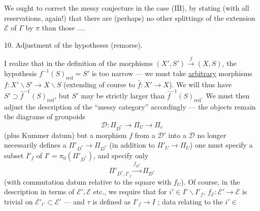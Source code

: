 We ought to correct the messy conjecture in the case (\uline{$\overline{\mathrm{III}}$}), by stating (with all reservations, again!) that there are (perhaps) no other splittings of the extension $\mathcal{E}$ of $\Gamma$ by $\pi$ than those ....



10. Adjustment of the hypotheses (remorse).

I realize that in the definition of the morphisms $(X',S')\xrightarrow{f}(X,S)$, the hypothesis $f^{-1}(S)_{\mathrm{red}}=S'$ is too narrow --- we must take \uline{arbitrary} morphisms $f:X'\backslash S'\to X\backslash S$ (extending of course to $\widehat{f}:X'\to X$).
We will thus have $S'\supset\widehat{f}^{-1}(S)_{\mathrm{red}}$, but $S'$ may be strictly larger than $\widehat{f}^{-1}(S)_{\mathrm{red}}$.
We must then adjust the description of the ``messy category'' accordingly --- the objects remain the diagrams of groupoids
\[
\mathcal{D}:\Pi_{D^*}\to\Pi_U\to\Pi_e
\]
(plus Kummer datum) but a morphism $f$ from a $\mathcal{D}'$ into a $\mathcal{D}$ no longer necessarily defines a $\Pi'_{D^*}\to\Pi_{D^*}$ (in addition to $\Pi'_U\to\Pi_U$) one must specify a subset $I'_f$ of $I'=\pi_0(\Pi'_{D^*})$, and specify only
\[
\Pi'_{D^*,I'_f}\xrightarrow{f_{D^*}}\Pi_{D^*}
\]
(with commutation datum  relative to the square with $f_U$).
Of course, in the description in terms of $\mathcal{E}',\mathcal{E}$ etc., we require that for $i'\in I'\backslash I'_f$, $f_{\mathcal{E}}:\mathcal{E}'\to\mathcal{E}$ is trivial on $\mathcal{E}'_{i'}\subset\mathcal{E}'$ --- and $\tau$ is defined as $I'_f\to I$ ;  data relating to the $i'\in$

